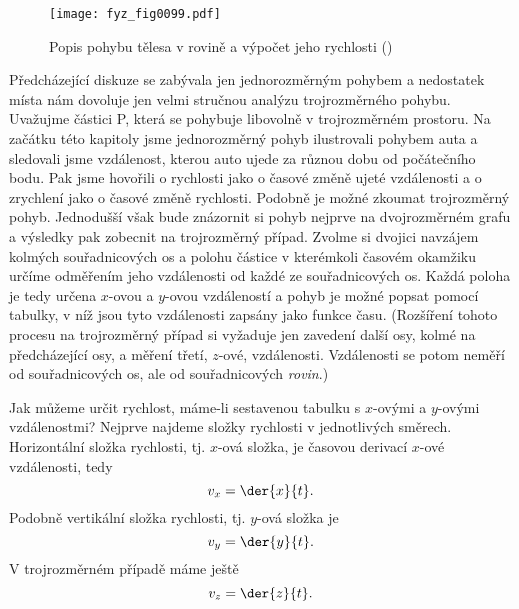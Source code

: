     \begin{figure}[ht!]  %
      \centering
      \texttt{[image: fyz\_fig0099.pdf]}
      \caption{Popis pohybu tělesa v rovině a výpočet jeho rychlosti
               (\cite[s.~118]{Feynman01})}
      \label{fyz:fig0099}
    \end{figure}
    Předcházející diskuze se zabývala jen jednorozměrným pohybem a nedostatek místa nám dovoluje 
    jen velmi stručnou analýzu trojrozměrného pohybu. Uvažujme částici P, která se pohybuje 
    libovolně v trojrozměrném prostoru. Na začátku této kapitoly jsme jednorozměrný pohyb 
    ilustrovali pohybem auta a sledovali jsme vzdálenost, kterou auto ujede za různou dobu od 
    počátečního bodu. Pak jsme hovořili o rychlosti jako o časové změně ujeté vzdálenosti a o 
    zrychlení jako o časové změně rychlosti. Podobně je možné zkoumat trojrozměrný pohyb. 
    Jednodušší však bude znázornit si pohyb nejprve na dvojrozměrném grafu a výsledky pak zobecnit 
    na trojrozměrný případ. Zvolme si dvojici navzájem kolmých souřadnicových os a polohu částice v 
    kterémkoli časovém okamžiku určíme odměřením jeho vzdálenosti od každé ze souřadnicových os. 
    Každá poloha je tedy určena \(x\)-ovou a \(y\)-ovou vzdáleností a pohyb je možné popsat pomocí 
    tabulky, v níž jsou tyto vzdálenosti zapsány jako funkce času. (Rozšíření tohoto procesu na 
    trojrozměrný případ si vyžaduje jen zavedení další osy, kolmé na předcházející osy, a měření 
    třetí, \(z\)-ové, vzdálenosti. Vzdálenosti se potom neměří od souřadnicových os, ale od 
    souřadnicových \emph{rovin}.)
    
    Jak můžeme určit rychlost, máme-li sestavenou tabulku s \(x\)-ovými a \(y\)-ovými vzdálenostmi? 
    Nejprve najdeme složky rychlosti v jednotlivých směrech. Horizontální složka rychlosti, tj. 
    \(x\)-ová složka, je časovou derivací \(x\)-ové vzdálenosti, tedy
    \begin{equation}\label{fyz:eq106}
      v_x = \der{x}{t}.
    \end{equation}
    Podobně vertikální složka rychlosti, tj. \(y\)-ová složka je
    \begin{equation}\label{fyz:eq108}
      v_y = \der{y}{t}.
    \end{equation}
    V trojrozměrném případě máme ještě
    \begin{equation}\label{fyz:eq107}
      v_z = \der{z}{t}.
    \end{equation}
    
